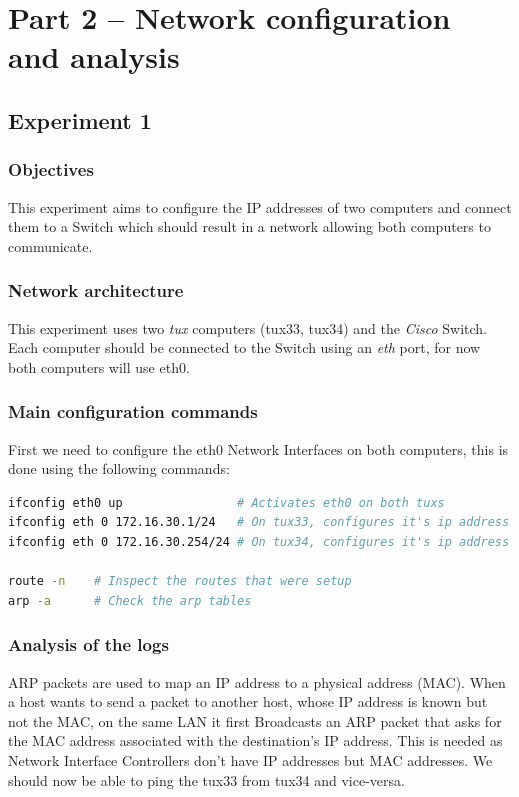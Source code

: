 \documentclass[a4paper,11pt,english]{article}
\begin{document}
\section{Part 2 -- Network configuration and analysis}

    \subsection{Experiment 1}

        \subsubsection{Objectives}
            This experiment aims to configure the IP addresses of two computers and connect
            them to a Switch which should result in a network allowing both computers to
            communicate.

        \subsubsection{Network architecture}
            This experiment uses two \textit{tux} computers (tux33, tux34) and the 
            \textit{Cisco} Switch. Each computer should be connected to the Switch 
            using an \textit{eth} port, for now both computers will use eth0. 
            
        \subsubsection{Main configuration commands}
            First we need to configure the eth0 Network Interfaces on both computers, this
            is done using the following commands:

\begin{lstlisting}[language=sh]
ifconfig eth0 up                # Activates eth0 on both tuxs
ifconfig eth 0 172.16.30.1/24   # On tux33, configures it's ip address on eth0
ifconfig eth 0 172.16.30.254/24 # On tux34, configures it's ip address on eth0

route -n    # Inspect the routes that were setup
arp -a      # Check the arp tables
\end{lstlisting}
            
        \subsubsection{Analysis of the logs}
            ARP packets are used to map an IP address to a physical address (MAC). When a host wants
            to send a packet to another host, whose IP address is known but not the MAC, on the same LAN
            it first Broadcasts an ARP packet that asks for the MAC address associated with the
            destination's IP address. This is needed as Network Interface Controllers don't have IP addresses but 
            MAC addresses. We should now be able to ping the tux33 from tux34 and vice-versa.
\end{document}
